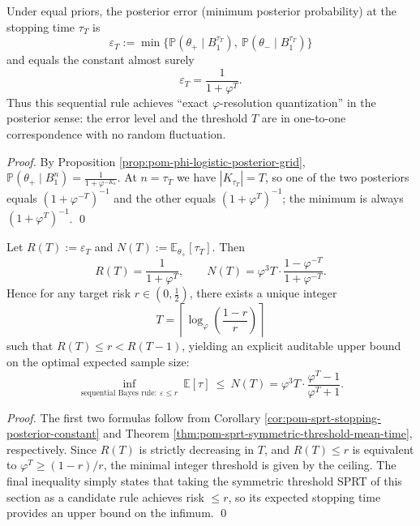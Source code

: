 \begin{corollary}\label{cor:pom-sprt-stopping-posterior-constant}
Under equal priors, the posterior error (minimum posterior probability) at the stopping time \(\tau_T\) is
\[
\varepsilon_T:=\min\{\mathbb{P}(\theta_+\mid B_1^{\tau_T}),\ \mathbb{P}(\theta_-\mid B_1^{\tau_T})\}
\]
and equals the constant almost surely
\[
\boxed{\;\varepsilon_T=\frac{1}{1+\varphi^{T}}.\;}
\]
Thus this sequential rule achieves ``exact \(\varphi\)-resolution quantization'' in the posterior sense: the error level and the threshold \(T\) are in one-to-one correspondence with no random fluctuation.
\end{corollary}

\begin{proof}
By Proposition \ref{prop:pom-phi-logistic-posterior-grid},
\(
\mathbb{P}(\theta_+\mid B_1^n)=\frac{1}{1+\varphi^{-K_n}}
\).
At \(n=\tau_T\) we have \(|K_{\tau_T}|=T\), so one of the two posteriors equals \((1+\varphi^{-T})^{-1}\) and the other equals \((1+\varphi^{T})^{-1}\); the minimum is always \((1+\varphi^{T})^{-1}\). \qed
\end{proof}

\begin{proposition}\label{prop:pom-risk-complexity-frontier}
Let \(R(T):=\varepsilon_T\) and \(N(T):=\mathbb{E}_{\theta_+}[\tau_T]\).
Then
\[
\boxed{\;
R(T)=\frac{1}{1+\varphi^{T}},\qquad
N(T)=\varphi^{3}T\cdot\frac{1-\varphi^{-T}}{1+\varphi^{-T}}.\;}
\]
Hence for any target risk \(r\in(0,\tfrac12)\), there exists a unique integer
\[
T=\left\lceil\log_\varphi\!\left(\frac{1-r}{r}\right)\right\rceil
\]
such that \(R(T)\le r<R(T-1)\), yielding an explicit auditable upper bound on the optimal expected sample size:
\[
\inf_{\text{sequential Bayes rule}:\ \varepsilon\le r}\ \mathbb{E}[\tau]
\ \le\ N(T)
=\varphi^{3}T\cdot\frac{\varphi^{T}-1}{\varphi^{T}+1}.
\]
\end{proposition}

\begin{proof}
The first two formulas follow from Corollary \ref{cor:pom-sprt-stopping-posterior-constant} and Theorem \ref{thm:pom-sprt-symmetric-threshold-mean-time}, respectively.
Since \(R(T)\) is strictly decreasing in \(T\), and \(R(T)\le r\) is equivalent to \(\varphi^T\ge (1-r)/r\), the minimal integer threshold is given by the ceiling.
The final inequality simply states that taking the symmetric threshold SPRT of this section as a candidate rule achieves risk \(\le r\), so its expected stopping time provides an upper bound on the infimum. \qed
\end{proof}

